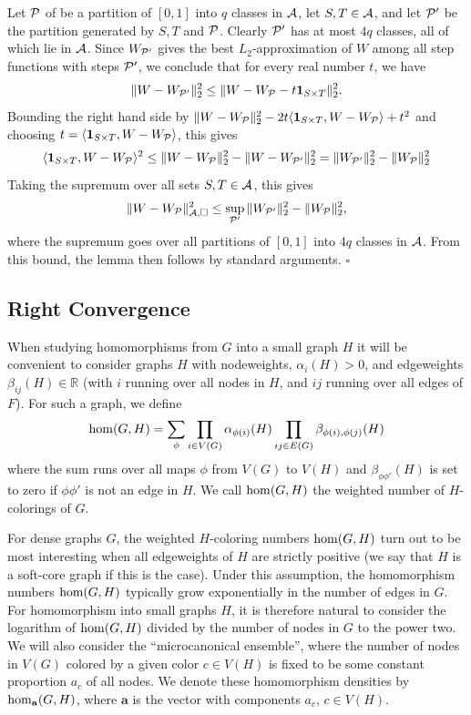 \documentclass[12pt]{article}
\numberwithin{equation}{section}
\newenvironment{proof}{\medskip\noindent{\bf Proof.
}}{\hfill$\square$\medskip}
\def\hom{{\rm hom}}
\def\one{{\mathbf 1}}
\def\ba{{\mathbf a}}
\def\R{{\mathbb R}}
\def\AA{{\cal A}}\def\BB{{\cal B}}\def\CC{{\cal C}}
\def\PP{{\cal P}}\def\QQ{{\cal Q}}\def\RR{{\cal R}}
\begin{document}
\begin{proof}
{Let $\PP$ of be a partition of $[0,1]$ into $q$ classes in $\AA$,
let $S,T\in\AA$, and let $\PP'$ be the partition generated by $S,T$
and $\PP$. Clearly $\PP'$ has at most $4q$ classes, all of which lie
in $\AA$. Since $W_{\PP'}$ gives the best $L_2$-approximation of $W$
among all step functions with steps $\PP'$, we conclude that for
every real number $t$, we have
\[
\|W-W_{\PP'}\|_2^2 \le \|W-W_\PP-t\one_{S\times T}\|^2_2.
\]
Bounding the right hand side by $\|W-W_\PP\|_2^2 - 2t
\langle\one_{S\times T}, W-W_\PP\rangle +t^2$ and choosing
$t=\langle\one_{S\times T}, W-W_\PP\rangle$, this gives
\[
\langle\one_{S\times T}, W-W_\PP\rangle^2 \le
\|W-W_\PP\|_2^2-\|W-W_{\PP'}\|_2^2 =\|W_{\PP'}\|_2^2-\|W_{\PP}\|_2^2
\]
Taking the supremum over all sets $S,T\in\AA$, this gives
\begin{equation}
\label{S-disguise} \|W-W_\PP\|_{\AA,\square}^2 \le
\sup_{\PP'}\|W_{\PP'}\|_2^2- \|W_\PP\|_2^2,
\end{equation}
where the supremum goes over all partitions of $[0,1]$ into $4q$
classes in $\AA$. From this bound, the lemma then follows by standard
arguments.}
\end{proof}


\subsection{Right Convergence}

When studying homomorphisms from $G$ into a small graph $H$ it will
be convenient to consider graphs $H$ with nodeweights,
$\alpha_i(H)>0$, and edgeweights $\beta_{ij}(H)\in\R$ (with $i$
running over all nodes in $H$, and $ij$ running over all edges of
$F$). For such a graph, we define
\[
\hom(G,H)=\sum_{\phi} \prod_{i\in V(G)}\alpha_{\phi(i)}(H)
\prod_{ij\in E(G)}\beta_{\phi(i),\phi(j)}(H)
\]
where the sum runs over all maps $\phi$ from $V(G)$ to $V(H)$ and
$\beta_{\phi\phi'}(H)$ is set to zero if $\phi\phi'$ is not an edge
in $H$. We call $\hom(G,H)$ the weighted number of $H$-colorings of
$G$.

For dense graphs $G$, the weighted $H$-coloring numbers $\hom(G,H)$
turn out to be most interesting when all edgeweights of $H$ are
strictly positive (we say that $H$ is a soft-core graph if this is
the case).  Under this assumption, the homomorphism numbers
$\hom(G,H)$ typically grow exponentially in the number of edges in
$G$. For homomorphism into small graphs $H$, it is therefore natural
to consider the logarithm of $\hom(G,H)$ divided by the number of
nodes in $G$ to the power two. We will also consider the
``microcanonical ensemble'', where the number of nodes in $V(G)$
colored by a given color $c\in V(H)$ is fixed to be some constant
proportion $a_c$ of all nodes. We denote these homomorphism densities
by $\hom_{\ba}(G,H)$, where $\ba$ is the  vector with components
$a_c$, $c\in V(H)$.
\end{document}
